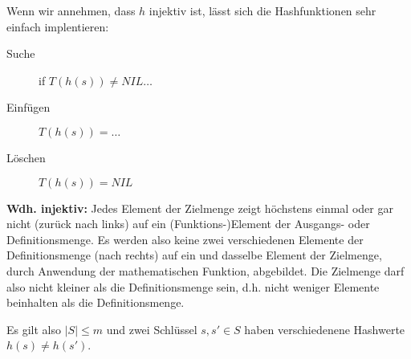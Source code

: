Wenn wir annehmen, dass \(h\) injektiv ist, lässt sich die Hashfunktionen sehr einfach implentieren:
\begin{description}
	\item[Suche] if \(T(h(s)) \neq NIL \dots\)
	\item[Einfügen] \(T(h(s)) = \dots\)
	\item[Löschen] \(T(h(s)) = NIL\)
\end{description}

\begin{shaded}
	\noindent
	\textbf{Wdh. injektiv:} Jedes Element der Zielmenge zeigt höchstens einmal oder gar nicht (zurück nach links) auf ein (Funktions-)Element der Ausgangs- oder Definitionsmenge.
		Es werden also keine zwei verschiedenen Elemente der Definitionsmenge (nach rechts) auf ein und dasselbe Element der Zielmenge, durch Anwendung der mathematischen Funktion, abgebildet.
		Die Zielmenge darf also nicht kleiner als die Definitionsmenge sein, d.h. nicht weniger Elemente beinhalten als die Definitionsmenge.
		
		Es gilt also \(|S| \leq m\) und zwei Schlüssel \(s, s' \in S\) haben  verschiedenene Hashwerte \(h(s) \neq h(s')\).
\end{shaded}

